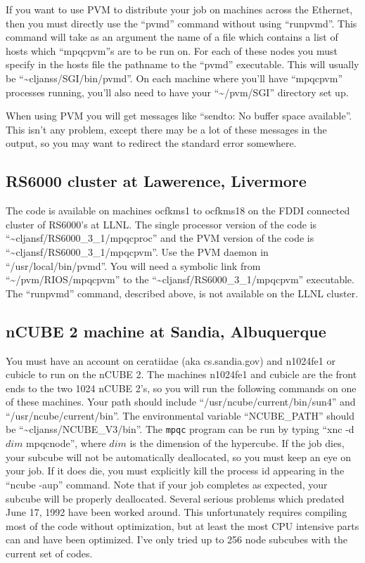 If you want to use PVM to distribute your job on machines across the
Ethernet, then you must directly use the ``pvmd'' command without using
``runpvmd''.  This command will take as an argument the name of a file
which contains a list of hosts which ``mpqcpvm''s are to be run on.
For each of these nodes you must specify in the hosts file the pathname
to the ``pvmd'' executable.  This will usually be ``\~{}cljanss/SGI/bin/pvmd''.
On each machine where you'll have ``mpqcpvm'' processes running, you'll
also need to have your ``\~{}/pvm/SGI'' directory set up.

When using PVM you will get messages like ``sendto: No buffer space available''.
This isn't any problem, except there may be a lot of these messages
in the output,
so you may want to redirect the standard error somewhere.

\subsection{RS6000 cluster at Lawerence, Livermore}
The code is available on machines ocfkms1 to ocfkms18 on the
FDDI connected cluster of RS6000's at LLNL.  The single processor
version of the code is ``\~{}cljansf/RS6000_3_1/mpqcproc'' and the
PVM version of the code is ``\~{}cljansf/RS6000_3_1/mpqcpvm''.  Use the
PVM daemon in ``/usr/local/bin/pvmd''.  You will need a symbolic link
from ``\~{}/pvm/RIOS/mpqcpvm'' to the
``\~{}cljansf/RS6000_3_1/mpqcpvm'' executable.  The ``runpvmd'' command,
described above, is not available on the LLNL cluster.

\subsection{nCUBE 2 machine at Sandia, Albuquerque}
You must have an account on ceratiidae (aka cs.sandia.gov) and
n1024fe1 or cubicle to run on the nCUBE 2.  The machines n1024fe1 and
cubicle are the front ends to the two 1024 nCUBE 2's, so you will
run the following commands on one of these machines.
Your path should include
``/usr/ncube/current/bin/sun4'' and ``/usr/ncube/current/bin''.
The environmental variable ``NCUBE\_PATH'' should be
``\~{}cljanss/NCUBE\_V3/bin''.
The {\tt mpqc} program can be run by typing ``xnc -d$dim$ mpqcnode'', where
$dim$ is the dimension of the hypercube.
If the job dies, your subcube will not be automatically deallocated,
so you must keep an eye on your job.  If it does die, you must explicitly
kill the process id appearing in the ``ncube -aup'' command.
Note that if your job completes as expected, your subcube will be properly
deallocated.
Several serious problems which predated June 17, 1992
have been worked around.  This unfortunately requires compiling most
of the code without optimization, but at least the most CPU intensive parts
can and have been optimized.  I've only tried up to 256 node subcubes with the
current set of codes.


